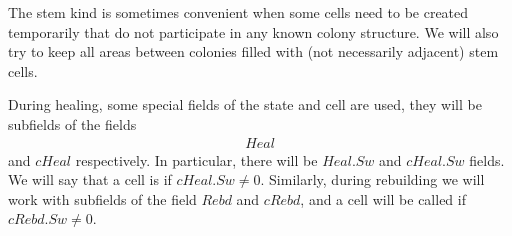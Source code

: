 \documentclass[12pt]{memoir}
\newcommand{\fld}[1]{\ensuremath{\textit{#1}}}
\newcommand{\Z}{Z}
\newcommand{\Addr}{\fld{Addr}}
\newcommand{\cAddr}{\fld{cAddr}}
\newcommand{\Rebd}{\fld{Rebd}}
\newcommand{\cRebd}{\fld{cRebd}}
\newcommand{\Core}{\fld{Core}}
\newcommand{\cCore}{\fld{cCore}}
\newcommand{\Drift}{\fld{Drift}}
\newcommand{\cDrift}{\fld{cDrift}}
\newcommand{\Kind}{\fld{Kind}}
\newcommand{\cKind}{\fld{cKind}}
\newcommand{\Heal}{\fld{Heal}}
\newcommand{\cHeal}{\fld{cHeal}}
\newcommand{\Sweep}{\fld{Sw}}
\newcommand{\cSweep}{\fld{cSw}}
\newcommand{\ZigDepth}{\fld{ZigDepth}}
\newcommand{\ZigDir}{\fld{ZigDir}}
\newcommand{\Stem}{\mathrm{Stem}}
\begin{document}
The stem kind is sometimes convenient when some cells need to be created temporarily
that do not participate in any known colony structure.
We will also try to keep all areas between colonies filled with (not necessarily adjacent)
stem cells.





During healing, some special fields of the state and cell are used, they will be subfields of 
the fields
 \begin{align}\label{eq:Heal}
   \Heal
 \end{align} 
and \( \cHeal \) respectively.
In particular, there will be \( \Heal.\Sweep \) and \( \cHeal.\Sweep \) fields.
We will say that a cell is  if \( \cHeal.\Sweep\ne 0 \).
Similarly, during rebuilding we will work with subfields of the field \( \Rebd \) and
\( \cRebd \), and a cell will be called  if \( \cRebd.\Sweep\ne 0 \).

\end{document}
